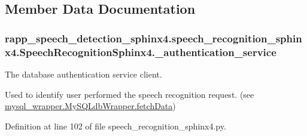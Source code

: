 \subsection{Member Data Documentation}
\hypertarget{classrapp__speech__detection__sphinx4_1_1speech__recognition__sphinx4_1_1SpeechRecognitionSphinx4_a3bec3325c78ed73478b35a9872589f1a}{
\subsubsection[{\-\_\-authentication\-\_\-service}]{\setlength{\rightskip}{0pt plus 5cm}rapp\-\_\-speech\-\_\-detection\-\_\-sphinx4.\-speech\-\_\-recognition\-\_\-sphinx4.\-Speech\-Recognition\-Sphinx4.\-\_\-authentication\-\_\-service\hspace{0.3cm}{\ttfamily [private]}}}\label{classrapp__speech__detection__sphinx4_1_1speech__recognition__sphinx4_1_1SpeechRecognitionSphinx4_a3bec3325c78ed73478b35a9872589f1a}


The database authentication service client. 

Used to identify user performed the speech recognition request. (see \hyperlink{classmysql__wrapper_1_1MySQLdbWrapper_af3d0d075cbbefe8edb35f5c3755a0df1}{mysql\-\_\-wrapper.\-My\-S\-Q\-Ldb\-Wrapper.\-fetch\-Data}) 

Definition at line 102 of file speech\-\_\-recognition\-\_\-sphinx4.\-py.

